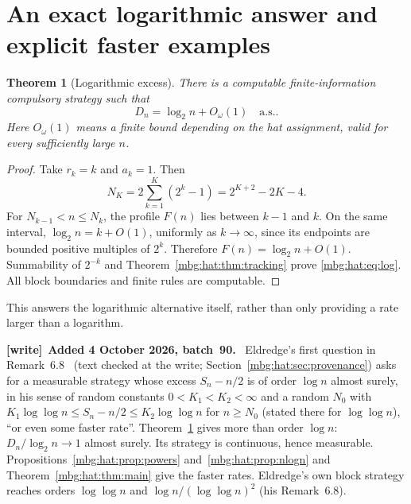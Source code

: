\documentclass[11pt,letterpaper]{article}
\newtheorem{theorem}{Theorem}[section]
\theoremstyle{definition}
\newcommand{\as}{\text{a.s.}}
\newenvironment{writenote}[1][]{\par\smallskip\begingroup\small
 \noindent\textbf{[write]}\if\relax\detokenize{#1}\relax\else~\textbf{#1.}\fi\ }%
 {\par\endgroup\smallskip}
\begin{document}
\section{An exact logarithmic answer and explicit faster examples}
\label{mbg:hat:sec:examples}

\begin{theorem}[Logarithmic excess]\label{mbg:hat:thm:log}
There is a computable finite-information compulsory strategy such that
\[
  D_n=\log_2 n+O_\omega(1)\quad\as.                       \tag{23.1}\label{mbg:hat:eq:log}
\]
Here \(O_\omega(1)\) means a finite bound depending on the hat
assignment, valid for every sufficiently large \(n\).
\end{theorem}
\begin{proof}
Take \(r_k=k\) and \(a_k=1\). Then
\[
  N_K=2\sum_{k=1}^K(2^k-1)=2^{K+2}-2K-4.
\]
For \(N_{k-1}<n\le N_k\), the profile \(F(n)\) lies between
\(k-1\) and \(k\). On the same interval,
\(\log_2 n=k+O(1)\), uniformly as \(k\to\infty\), since its
endpoints are bounded positive multiples of \(2^k\).
Therefore \(F(n)=\log_2 n+O(1)\). Summability of \(2^{-k}\) and
Theorem~\ref{mbg:hat:thm:tracking} prove \eqref{mbg:hat:eq:log}. All block
boundaries and finite rules are computable.
\end{proof}

This answers the logarithmic alternative itself, rather than only
providing a rate larger than a logarithm.

\begin{writenote}[Added 4 October 2026, batch~90]
Eldredge's first question in Remark~6.8~\cite{hat:Eldredge} (text checked at the write; Section~\ref{mbg:hat:sec:provenance}) asks for a measurable strategy whose excess $S_n-n/2$ is of order $\log n$ almost surely, in his sense of random constants $0<K_1<K_2<\infty$ and a random $N_0$ with $K_1\log\log n\le S_n-n/2\le K_2\log\log n$ for $n\ge N_0$ (stated there for $\log\log n$), ``or even some faster rate''. Theorem~\ref{mbg:hat:thm:log} gives more than order $\log n$: $D_n/\log_2 n\to1$ almost surely. Its strategy is continuous, hence measurable. Propositions~\ref{mbg:hat:prop:powers} and~\ref{mbg:hat:prop:nlogn} and Theorem~\ref{mbg:hat:thm:main} give the faster rates. Eldredge's own block strategy reaches orders $\log\log n$ and $\log n/(\log\log n)^2$ (his Remark~6.8).
\end{writenote}
\end{document}
